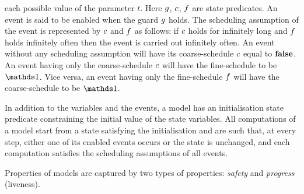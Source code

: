 each possible value of the parameter $t$.  Here $g$, $c$,
$f$ are state predicates.  An event is said to be
enabled when the guard $g$ holds.  The scheduling assumption of
the event is represented by $c$ and $f$ as follows: if
$c$ holds for infinitely long and $f$ holds infinitely
often then the event is carried out infinitely often.  An event
without any scheduling assumption will have its coarse-schedule
$c$ equal to $\mathbf{false}$.  An event having only the
coarse-schedule $c$ will have the fine-schedule to be $\one$.
Vice versa, an event having only the fine-schedule $f$ will
have the coarse-schedule to be $\one$.%

In addition to the variables and the events, a model has an
initialisation state predicate \init constraining the initial value of
the state variables.
All computations of a model start from a state satisfying the
initialisation and are such that, at every step, either one of its
enabled events occurs or the state is unchanged, and each computation
satisfies the scheduling assumptions of all events.

Properties of \unitb models are captured by two types of properties:
\emph{safety} and \emph{progress} (liveness).


